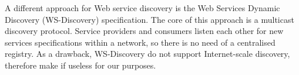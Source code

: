 A different approach for Web service discovery is the Web Services Dynamic Discovery (WS-Discovery) specification. The core of this approach is a multicast discovery protocol. Service providers and consumers  listen each other for new services specifications within a network, so there is no need of a centralised registry. As a drawback, WS-Discovery do not support Internet-scale discovery, therefore make if useless for our purposes.
